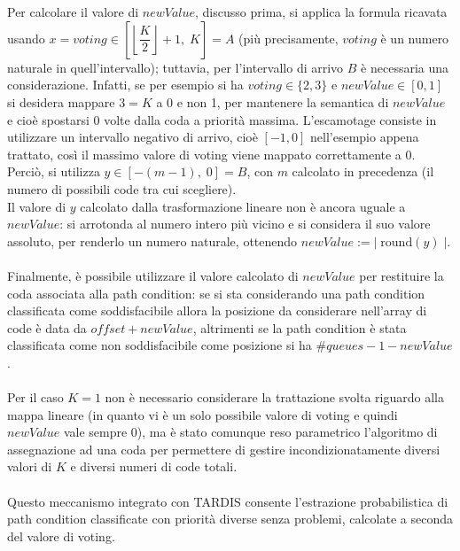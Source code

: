 \documentclass[a4paper, 12pt, oneside]{book}
\theoremstyle{normal}
\begin{document}
\\ \\ Per calcolare il valore di $newValue$, discusso prima, si applica la formula ricavata usando $x = voting \in \left [ \left\lfloor \dfrac{K}{2} \right\rfloor + 1, \; K \right ] = A$ (più precisamente, $voting$ è un numero naturale in quell'intervallo); tuttavia, per l'intervallo di arrivo $B$ è necessaria una considerazione. Infatti, se per esempio si ha $voting \in \{2, 3\}$ e $newValue \in [0, 1]$ si desidera mappare $3 = K$ a 0 e non 1, per mantenere la semantica di $newValue$ e cioè spostarsi 0 volte dalla coda a priorità massima. L'escamotage consiste in utilizzare un intervallo negativo di arrivo, cioè $[-1, 0]$ nell'esempio appena trattato, così il massimo valore di voting viene mappato correttamente a 0. Perciò, si utilizza $y \in \left [ - (m - 1), \; 0 \right ] = B$, con $m$ calcolato in precedenza (il numero di possibili code tra cui scegliere). \\ Il valore di $y$ calcolato dalla trasformazione lineare non è ancora uguale a $newValue$: si arrotonda al numero intero più vicino e si considera il suo valore assoluto, per renderlo un numero naturale, ottenendo $newValue := | \; \text{round}(y)\; |$. 
\\ \\ Finalmente, è possibile utilizzare il valore calcolato di $newValue$ per restituire la coda associata alla path condition: se si sta considerando una path condition classificata come soddisfacibile allora la posizione da considerare nell'array di code è data da $offset + newValue$, altrimenti se la path condition è stata classificata come non soddisfacibile come posizione si ha $\#queues - 1 - newValue$.
\\ \\ Per il caso $K = 1$ non è necessario considerare la trattazione svolta riguardo alla mappa lineare (in quanto vi è un solo possibile valore di voting e quindi $newValue$ vale sempre 0), ma è stato comunque reso parametrico l'algoritmo di assegnazione ad una coda per permettere di gestire incondizionatamente diversi valori di $K$ e diversi numeri di code totali.
\\ \\ Questo meccanismo integrato con TARDIS consente l'estrazione probabilistica di path condition classificate con priorità diverse senza problemi, calcolate a seconda del valore di voting.
\end{document}
